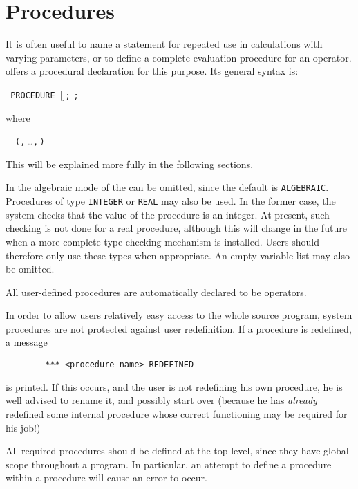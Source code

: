 \chapter{Procedures}
\hypertarget{command:PROCEDURE}{}

It is often useful to name a statement for repeated use in calculations
with varying parameters, or to define a complete evaluation procedure for
an operator. {\REDUCE} offers a procedural declaration for this purpose. Its
general syntax is:
\begin{syntax}
  \texttt{ PROCEDURE }[]\texttt{;}
    \texttt{;}
\end{syntax}
where
\begin{syntax}
  \ \BNFprod\ \texttt{(}\texttt{,}\,\dots\texttt{,}\,\texttt{)}
\end{syntax}
This will be explained more fully in the following sections.

In the algebraic mode of {\REDUCE} the  can be
omitted, since the default is \texttt{ALGEBRAIC}.  Procedures of type 
\texttt{INTEGER} or \texttt{REAL} may also be used.  In the former case, the system
checks that the value of the procedure is an integer.  At present, such
checking is not done for a real procedure, although this will change in
the future when a more complete type checking mechanism is installed.
Users should therefore only use these types when appropriate.  An empty
variable list may also be omitted.

All user-defined procedures are automatically declared to be operators.

In order to allow users relatively easy access to the whole {\REDUCE} source
program, system procedures are not protected against user redefinition. If
a procedure is redefined, a message
\begin{verbatim}
        *** <procedure name> REDEFINED
\end{verbatim}
is printed. If this occurs, and the user is not redefining his own
procedure, he is well advised to rename it, and possibly start over
(because he has {\em already\/} redefined some internal procedure whose correct
functioning may be required for his job!)

All required procedures should be defined at the top level, since they
have global scope throughout a program. In particular, an attempt to
define a procedure within a procedure will cause an error to occur.


